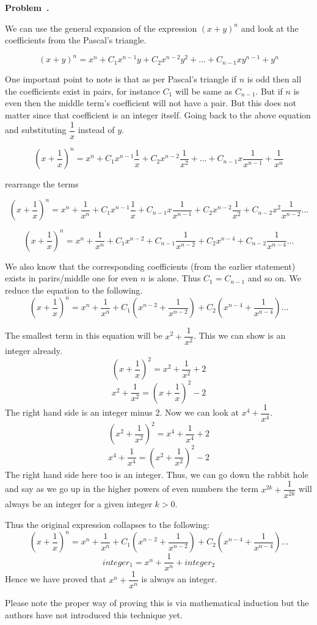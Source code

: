 \documentclass[10pt]{article}
\newcounter{problem}
\newenvironment{problem}[1][]{
  \refstepcounter{problem}
  \par\noindent\textbf{Problem~\theproblem. #1}\par
  \vspace{0.5em}
}{\vspace{1em}}
\begin{document}
\begin{problem} %
  We can use the general expansion of the expression $(x + y)^n$ and look at the coefficients from the Pascal's triangle.
  
  \[
    (x + y)^n = x^n + C_1x^{n - 1}y + C_2x^{n - 2}y^2 + ... + C_{n - 1}xy^{n - 1} + y^n
  \]

  One important point to note is that as per Pascal's triangle if $n$ is odd then all the coefficients exist in pairs, for
  instance $C_1$ will be same as $C_{n - 1}$. But if $n$ is even then the middle term's coefficient will not have a pair. But this
  does not matter since that coefficient is an integer itself. Going back to the above equation and substituting $\dfrac{1}{x}$ instead of $y$.

  \[
    (x + \dfrac{1}{x})^n = x^n + C_1x^{n - 1}\dfrac{1}{x} + C_2x^{n - 2}\dfrac{1}{x^2} + ... + C_{n - 1}x\dfrac{1}{x^{n - 1}} + \dfrac{1}{x^n}
  \]

  rearrange the terms

  \[
    (x + \dfrac{1}{x})^n = x^n + \dfrac{1}{x^n} + C_1x^{n - 1}\dfrac{1}{x} + C_{n - 1}x\dfrac{1}{x^{n - 1}} + C_2x^{n - 2}\dfrac{1}{x^2} + C_{n - 2}x^2\dfrac{1}{x^{n - 2}} ... 
  \]

  \[
    (x + \dfrac{1}{x})^n = x^n + \dfrac{1}{x^n} + C_1x^{n - 2} + C_{n - 1}\dfrac{1}{x^{n - 2}} + C_2x^{n - 4} + C_{n - 2}\dfrac{1}{x^{n - 4}} ... 
  \]

  We also know that the corresponding coefficients (from the earlier statement) exists in parirs/middle one for even $n$ is alone.
  Thus $C_1 = C_{n - 1}$ and so on. We reduce the equation to the following.\\
  \[
    (x + \dfrac{1}{x})^n = x^n + \dfrac{1}{x^n} + C_1\left(x^{n - 2} + \dfrac{1}{x^{n - 2}}\right) + C_2\left(x^{n - 4} + \dfrac{1}{x^{n - 4}}\right) ...
  \]

  The smallest term in this equation will be $x^2 + \dfrac{1}{x^2}$. This we can show is an integer already.
  \[
    (x + \dfrac{1}{x})^2 = x^2 + \dfrac{1}{x^2} + 2
  \]
  \[
    x^2 + \dfrac{1}{x^2} = (x + \dfrac{1}{x})^2 - 2
  \]
  The right hand side is an integer minus $2$. Now we can look at $x^4 + \dfrac{1}{x^4}$.
  \[
    (x^2 + \dfrac{1}{x^2})^2 = x^4 + \dfrac{1}{x^4} + 2
  \]
  \[
    x^4 + \dfrac{1}{x^4} = (x^2 + \dfrac{1}{x^2})^2 - 2
  \]
  The right hand side here too is an integer. Thus, we can go down the rabbit hole and say as we go up in the higher powers of 
  even numbers the term $x^{2k} + \dfrac{1}{x^{2k}}$ will always be an integer for a given integer $k > 0$.

  Thus the original expression collapses to the following:
  \[
    (x + \dfrac{1}{x})^n = x^n + \dfrac{1}{x^n} + C_1\left(x^{n - 2} + \dfrac{1}{x^{n - 2}}\right) + C_2\left(x^{n - 4} + \dfrac{1}{x^{n - 4}}\right) ...
  \]
  \[
    integer_1 = x^n + \dfrac{1}{x^n} + integer_2
  \]
  Hence we have proved that $x^n + \dfrac{1}{x^n}$ is always an integer.

  Please note the proper way of proving this is via mathematical induction but the authors have not introduced this technique yet.
\end{problem}
\end{document}
